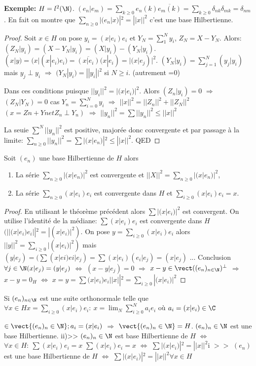 \textbf{Exemple:} $H=l^2(\N)$. $(e_n|e_m)=∑_{k≥0}e_n(k)\overline{e_m(k)}=∑_{k≥0}δ_{nk}δ_{mk}=δ_{nm}$. En fait on montre que $∑_{n≥0}|(e_n|x)|^2=||x||^2$ c'est une base Hilbertienne.
\begin{proof}
	Soit $x\in H$ on pose $y_i=(x|e_i)e_i$ et $Y_N=∑_1^Ny_i$, $Z_N=X-Y_N$. Alors: $(Z_N|y_i)=(X-Y_N|y_i)=(X|y_i)-(Y_N|y_i)$. $(x|y)=(x|(x|e_i)e_i)=\overline{(x|e_i)}(x|e_i)=|(x|e_j)|^2$. $(Y_N|y_i)=∑_{j=1}^N(y_j|y_i)$ mais $y_j\perp y_i$ $\Rightarrow$  $(Y_N|y_i) =||y_i||^2$ si $N≥i$.
	(autrement =0)

Dans ces conditions puisque $||y_i||^2=|(x|e_i)|^2$. Alors $(Z_n|y_i)=0$ $\Rightarrow$  $(Z_N|Y_N)=0$ cas $Y_n=∑_{i=0}^Ny_i$ $\Rightarrow$  $||x||^2=||Z_n||^2+||Z_N||^2$ $(x=Zn+Yn et Z_n\perp Y_n)$
$\Rightarrow$  $||y_n||^2=∑||y_n||^2≤||x||^2$


La seuie $∑^N||y_n||^2$ est positive, majorée donc convergente et par passage à la limite: $∑_{n≥0}||y_n||^2=∑|(x|e_n)|^2≤||x||^2$. QED


\end{proof}


\begin{theorem}
	Soit $(e_n)$ une base Hilbertienne de $H$ alors 
	\begin{enumerate}
		\item La série $∑_{n≥0}|(x|e_n)|^2$ est convergente et $||X||^2=∑_{n≥0}|(x|e_n)|^2$,
		\item La série $∑_{n≥0}(x|e_i)e_i$ est convergente dans $H$ et $∑_{i≥0}(x|e_i)e_i=x$.
	\end{enumerate}
\end{theorem}
\begin{proof}
	En utilisant le théorème précédent alors $∑|(x|e_i)|^2$ est convergent. On utilise l'identité de la médiane: $∑(x|e_i)e_i$ est convergente dans $H$ $(||(x|e_i)e_i||^2 =|(x|e_i)|^2)$.
	On pose $y=∑_{i≥0}(x|e_i)e_i$ alors $||y||^2 =∑_{i≥0}|(x|e_i)|^2)$ mais $(y|e_j)=(∑(x|ei)ei|e_j)=∑(x|e_i)(e_i|e_j)=(x|e_j)$ ...
	Conclusion $\forall j\in \N (x|e_j)=(y|e_j)$ $\Leftrightarrow$
	$ (x-y|e_j)=0$ $\Rightarrow$  $x-y\in\vect((e_n)_{n\in\N})^\perp$
	$\Rightarrow$  $x-y=0_H$ $\Leftrightarrow$ $x=y=∑(x|e_i) e_i ||x||^2=∑_{i≥0}|(x|e_i)|^2$
\end{proof}
\begin{remark}
	Si $(e_n)_{n\in \N}$ est une suite orthonormale telle que $\forall x\in H x=∑_{i≥0}(x|e_i)e_i:\ x=\lim_N ∑_{i≥0}^N a_ie_i$ où $a_i=(x|e_i)\in\C$ 
	
	
	$\in \vect\{(e_n)_n\in \N\}; a_i=(x|e_i)$ $\Rightarrow$  $\vect\{(e_n)_n\in\N\}=H$. $(e_n)_n\in \N$ est une base Hilbertienne.
	ii)>> $(e_n)_n\in\N$ est base Hilbertienne de $H$ $\Leftrightarrow$ $\forall x\in H:\ ∑(x|e_i)e_i=x $
	$∑(x|e_i)e_i=x$ $\Leftrightarrow$ $∑|(x|e_i)|^2=||x||^2 $i $>>$ $(e_n)$ est une base Hilbertienne de $H$ $\Leftrightarrow$ $∑|(x|e_i)|^2=||x||^2 \forall x\in H$
\end{remark}



